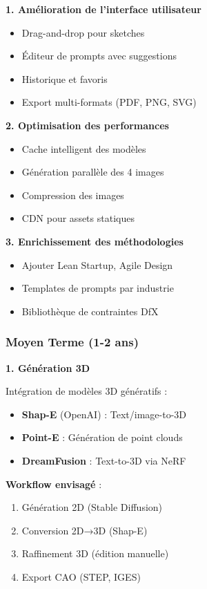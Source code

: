 \textbf{1. Amélioration de l'interface utilisateur}
\begin{itemize}[leftmargin=*]
    \item Drag-and-drop pour sketches
    \item Éditeur de prompts avec suggestions
    \item Historique et favoris
    \item Export multi-formats (PDF, PNG, SVG)
\end{itemize}

\textbf{2. Optimisation des performances}
\begin{itemize}[leftmargin=*]
    \item Cache intelligent des modèles
    \item Génération parallèle des 4 images
    \item Compression des images
    \item CDN pour assets statiques
\end{itemize}

\textbf{3. Enrichissement des méthodologies}
\begin{itemize}[leftmargin=*]
    \item Ajouter Lean Startup, Agile Design
    \item Templates de prompts par industrie
    \item Bibliothèque de contraintes DfX
\end{itemize}

\subsubsection{Moyen Terme (1-2 ans)}

\textbf{1. Génération 3D}

Intégration de modèles 3D génératifs :
\begin{itemize}[leftmargin=*]
    \item \textbf{Shap-E} (OpenAI) : Text/image-to-3D
    \item \textbf{Point-E} : Génération de point clouds
    \item \textbf{DreamFusion} : Text-to-3D via NeRF
\end{itemize}

\textbf{Workflow envisagé} :
\begin{enumerate}[leftmargin=*]
    \item Génération 2D (Stable Diffusion)
    \item Conversion 2D→3D (Shap-E)
    \item Raffinement 3D (édition manuelle)
    \item Export CAO (STEP, IGES)
\end{enumerate}


